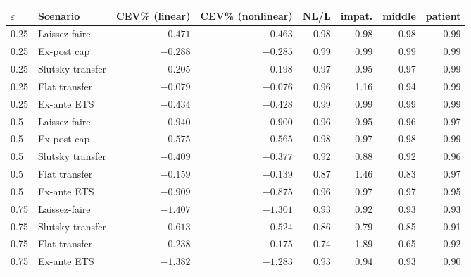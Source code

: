 \documentclass[11pt]{article}
\begin{document}
\begin{center}\small
\begin{tabular}{llrrrrrr}
\toprule
$\varepsilon$ & Scenario & CEV\% (linear) & CEV\% (nonlinear) & NL/L & impat. & middle & patient\\
\midrule
0.25 & Laissez-faire    & $-0.471$ & $-0.463$ & 0.98 & 0.98 & 0.98 & 0.99\\
0.25 & Ex-post cap      & $-0.288$ & $-0.285$ & 0.99 & 0.99 & 0.99 & 0.99\\
0.25 & Slutsky transfer & $-0.205$ & $-0.198$ & 0.97 & 0.95 & 0.97 & 0.99\\
0.25 & Flat transfer    & $-0.079$ & $-0.076$ & 0.96 & 1.16 & 0.94 & 0.99\\
0.25 & Ex-ante ETS      & $-0.434$ & $-0.428$ & 0.99 & 0.99 & 0.99 & 0.99\\
\midrule
0.5  & Laissez-faire    & $-0.940$ & $-0.900$ & 0.96 & 0.95 & 0.96 & 0.97\\
0.5  & Ex-post cap      & $-0.575$ & $-0.565$ & 0.98 & 0.97 & 0.98 & 0.99\\
0.5  & Slutsky transfer & $-0.409$ & $-0.377$ & 0.92 & 0.88 & 0.92 & 0.96\\
0.5  & Flat transfer    & $-0.159$ & $-0.139$ & 0.87 & 1.46 & 0.83 & 0.97\\
0.5  & Ex-ante ETS      & $-0.909$ & $-0.875$ & 0.96 & 0.97 & 0.97 & 0.95\\
\midrule
0.75 & Laissez-faire    & $-1.407$ & $-1.301$ & 0.93 & 0.92 & 0.93 & 0.93\\
0.75 & Slutsky transfer & $-0.613$ & $-0.524$ & 0.86 & 0.79 & 0.85 & 0.91\\
0.75 & Flat transfer    & $-0.238$ & $-0.175$ & 0.74 & 1.89 & 0.65 & 0.92\\
0.75 & Ex-ante ETS      & $-1.382$ & $-1.283$ & 0.93 & 0.94 & 0.93 & 0.90\\
\bottomrule
\end{tabular}
\end{center}
\end{document}
